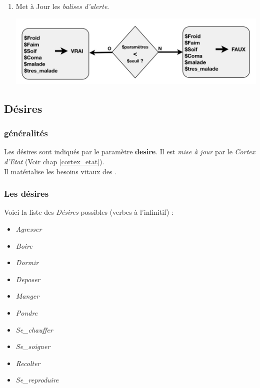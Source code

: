 \documentclass[french]{report}
\newlength{\du}\fi
\begin{document}
\begin{enumerate}
	\item Met à Jour les \textit{balises d'alerte}.
	\begin{center}
		\includegraphics[width=1\linewidth]{images/cortex05}
	\end{center}

\end{enumerate}

\subsection{Désires}\label{desire}
\subsubsection{généralités}
Les désires sont indiqués par le paramètre \textbf{desire}. Il est \textit{mise à jour} par le \textit{Cortex d'Etat} (Voir chap \ref{cortex_etat}).\\
Il matérialise les besoins vitaux des \CoCiX.\\

\subsubsection{Les désires}
Voici la liste des \textit{Désires} possibles (verbes à l'infinitif) : \\
\begin{itemize}
	\item \textit{Agresser}
	\item \textit{Boire}
	\item \textit{Dormir}
	\item \textit{Deposer}
	\item \textit{Manger}
	\item \textit{Pondre}
	\item \textit{Se\_chauffer}
	\item \textit{Se\_soigner}
	\item \textit{Recolter}
	\item \textit{Se\_reproduire}\\
\end{itemize}
\end{document}
